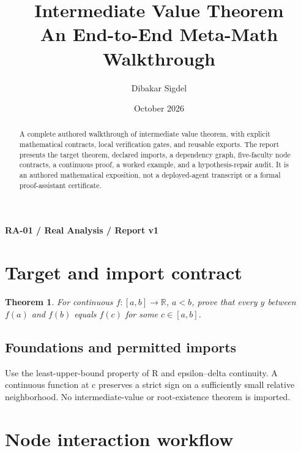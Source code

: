 \documentclass[preprint,12pt,aps,pra,showkeys,amsmath,amssymb,superscriptaddress,floatfix]{revtex4-2}
\newtheorem{theorem}{Theorem}[section]
\theoremstyle{definition}
\theoremstyle{remark}
\begin{document}
\title{Intermediate Value Theorem\\[4pt]\large An End-to-End Meta-Math Walkthrough}

\author{Dibakar Sigdel}


\date{October 2026}

\begin{abstract}

A complete authored walkthrough of intermediate value theorem, with
explicit mathematical contracts, local verification gates, and reusable
exports. The report presents the target theorem, declared imports, a
dependency graph, five-faculty node contracts, a continuous proof, a
worked example, and a hypothesis-repair audit. It is an authored
mathematical exposition, not a deployed-agent transcript or a formal
proof-assistant certificate.

\end{abstract}\maketitle\linespread{1.12}\selectfont

\noindent\textbf{RA-01 / Real Analysis / Report v1}

\section{Target and import contract}

\begin{theorem}

For continuous \(f:[a,b]\to\mathbb R\), \(a<b\), prove that every \(y\)
between \(f(a)\) and \(f(b)\) equals \(f(c)\) for some \(c\in[a,b]\).

\end{theorem}

\subsection{Foundations and permitted imports}

Use the least-upper-bound property of R and epsilon--delta continuity. A
continuous function at c preserves a strict sign on a sufficiently small
relative neighborhood. No intermediate-value or root-existence theorem
is imported.

\clearpage\section{Node interaction workflow}
\end{document}
